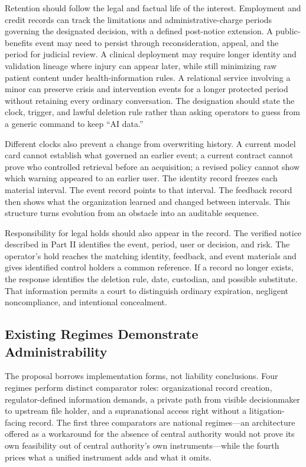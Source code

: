 Retention should follow the legal and factual life of the interest. Employment and credit records can track the limitations and administrative-charge periods governing the designated decision, with a defined post-notice extension. A public-benefits event may need to persist through reconsideration, appeal, and the period for judicial review. A clinical deployment may require longer identity and validation lineage where injury can appear later, while still minimizing raw patient content under health-information rules. A relational service involving a minor can preserve crisis and intervention events for a longer protected period without retaining every ordinary conversation. The designation should state the clock, trigger, and lawful deletion rule rather than asking operators to guess from a generic command to keep ``AI data.''

Different clocks also prevent a change from overwriting history. A current model card cannot establish what governed an earlier event; a current contract cannot prove who controlled retrieval before an acquisition; a revised policy cannot show which warning appeared to an earlier user. The identity record freezes each material interval. The event record points to that interval. The feedback record then shows what the organization learned and changed between intervals. This structure turns evolution from an obstacle into an auditable sequence.

Responsibility for legal holds should also appear in the record. The verified notice described in Part II identifies the event, period, user or decision, and risk. The operator's hold reaches the matching identity, feedback, and event materials and gives identified control holders a common reference. If a record no longer exists, the response identifies the deletion rule, date, custodian, and possible substitute. That information permits a court to distinguish ordinary expiration, negligent noncompliance, and intentional concealment.

\subsection{Existing Regimes Demonstrate Administrability}

The proposal borrows implementation forms, not liability conclusions. Four regimes perform distinct comparator roles: organizational record creation, regulator-defined information demands, a private path from visible decisionmaker to upstream file holder, and a supranational access right without a litigation-facing record. The first three comparators are national regimes---an architecture offered as a workaround for the absence of central authority would not prove its own feasibility out of central authority's own instruments---while the fourth prices what a unified instrument adds and what it omits.


